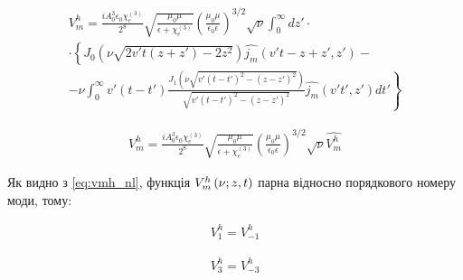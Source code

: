 %
%
\begin{equation} \begin{gathered} \label{eq:vmh_nl}
V_m^h = \frac{i A_0^3 \epsilon_0 \chi_e^{(3)}}{2^8}
\sqrt{\frac{\mu_0 \mu}{\epsilon + \chi_e^{(3)}}} 
\left( \frac{\mu_0 \mu}{\epsilon_0 \epsilon} \right)^{3/2} \sqrt{\nu}
\int_0^\infty dz' \cdot \\ \cdot 
\left\{ J_0 \left( \nu \sqrt{2 v't (z + z') - 2 z^2} \right) 
\hat{j_m} (v't - z + z',z') - \right. \\ 
\left. - \nu \int_0^\infty v'(t-t') 
\frac{J_1 \left( \nu \sqrt{v'(t-t')^2 - (z-z')^2} \right)}
{\sqrt{v'(t-t')^2 - (z-z')^2}} \hat{j_m} (v't',z') dt' \right\}
\end{gathered} \end{equation}

\begin{equation} \begin{aligned} \label{eq:vmh_norm}
V_m^h = \frac{i A_0^3 \epsilon_0 \chi_e^{(3)}}{2^8}
\sqrt{\frac{\mu_0 \mu}{\epsilon + \chi_e^{(3)}}} 
\left( \frac{\mu_0 \mu}{\epsilon_0 \epsilon} \right)^{3/2} 
\sqrt{\nu} \hat{V_m^h}
\end{aligned} \end{equation}

Як видно з \eqref{eq:vmh_nl}, функція $ V_m^h \left( \nu; z, t \right) $ парна відносно 
порядкового номеру моди, тому:

\begin{equation} \begin{aligned} \label{eq:vp1_vm1}
V_1^h = V_{-1}^h
\end{aligned} \end{equation}

\begin{equation} \begin{aligned} \label{eq:vp3_vm3}
V_3^h = V_{-3}^h
\end{aligned} \end{equation}

